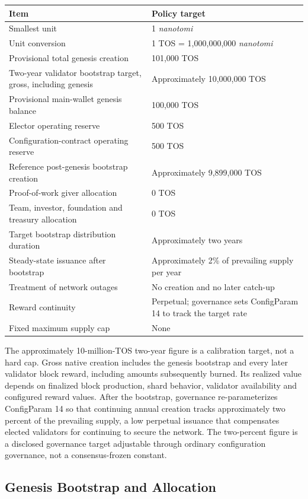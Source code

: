 \documentclass[11pt,oneside]{article}
\newcommand{\nanotos}{\textit{nanotomi}}
\begin{document}
\begin{longtable}{L{0.52\textwidth}L{0.38\textwidth}}
\toprule
Item & Policy target \\
\midrule
\endhead
Smallest unit & 1 \nanotos \\
Unit conversion & 1 TOS = 1,000,000,000 \nanotos \\
Provisional total genesis creation & 101,000 TOS \\
Two-year validator bootstrap target, gross, including genesis & Approximately 10,000,000 TOS \\
Provisional main-wallet genesis balance & 100,000 TOS \\
Elector operating reserve & 500 TOS \\
Configuration-contract operating reserve & 500 TOS \\
Reference post-genesis bootstrap creation & Approximately 9,899,000 TOS \\
Proof-of-work giver allocation & 0 TOS \\
Team, investor, foundation and treasury allocation & 0 TOS \\
Target bootstrap distribution duration & Approximately two years \\
Steady-state issuance after bootstrap & Approximately 2\% of prevailing supply per year \\
Treatment of network outages & No creation and no later catch-up \\
Reward continuity & Perpetual; governance sets ConfigParam 14 to track the target rate \\
Fixed maximum supply cap & None \\
\bottomrule
\end{longtable}

The approximately 10-million-TOS two-year figure is a calibration target, not a hard cap.
Gross native creation includes the genesis bootstrap and every later validator block reward,
including amounts subsequently burned. Its realized value depends on finalized block
production, shard behavior, validator availability and configured reward values. After the
bootstrap, governance re-parameterizes ConfigParam 14 so that continuing annual creation
tracks approximately two percent of the prevailing supply, a low perpetual issuance that
compensates elected validators for continuing to secure the network. The two-percent figure
is a disclosed governance target adjustable through ordinary configuration governance, not a
consensus-frozen constant.

\subsection{Genesis Bootstrap and Allocation}
\end{document}
